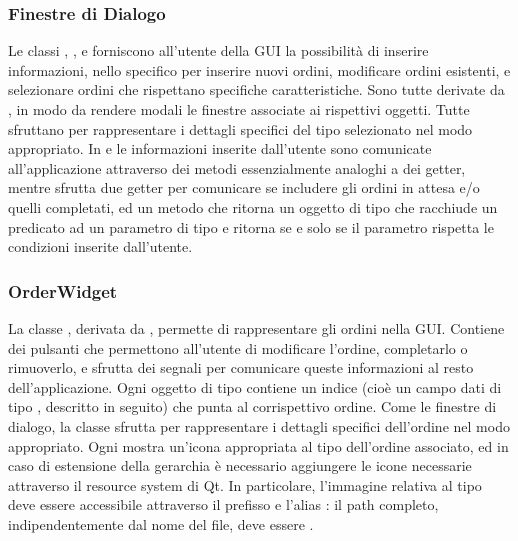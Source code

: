 \subsubsection{Finestre di Dialogo} %
\label{ssub:finestre_di_dialogo}
Le classi , , e  forniscono all'utente della GUI la possibilità di inserire informazioni, nello specifico per inserire nuovi ordini, modificare ordini esistenti, e selezionare ordini che rispettano specifiche caratteristiche. Sono tutte derivate da , in modo da rendere modali le finestre associate ai rispettivi oggetti. Tutte sfruttano  per rappresentare i dettagli specifici del tipo selezionato nel modo appropriato. In  e  le informazioni inserite dall'utente sono comunicate all'applicazione attraverso dei metodi essenzialmente analoghi a dei getter, mentre  sfrutta due getter per comunicare se includere gli ordini in attesa e/o quelli completati, ed un metodo che ritorna un oggetto di tipo  che racchiude un predicato ad un parametro di tipo  e ritorna  se e solo se il parametro rispetta le condizioni inserite dall'utente.
\subsubsection{OrderWidget} %
\label{ssub:orderwidget}
La classe , derivata da , permette di rappresentare gli ordini nella GUI. Contiene dei pulsanti che permettono all'utente di modificare l'ordine, completarlo o rimuoverlo, e sfrutta dei segnali per comunicare queste informazioni al resto dell'applicazione. Ogni oggetto di tipo  contiene un indice (cioè un campo dati di tipo , descritto in seguito) che punta al corrispettivo ordine. Come le finestre di dialogo, la classe sfrutta  per rappresentare i dettagli specifici dell'ordine nel modo appropriato. Ogni  mostra un'icona appropriata al tipo dell'ordine associato, ed in caso di estensione della gerarchia è necessario aggiungere le icone necessarie attraverso il resource system di Qt. In particolare, l'immagine relativa al tipo  deve essere accessibile attraverso il prefisso  e l'alias : il path completo, indipendentemente dal nome del file, deve essere .
